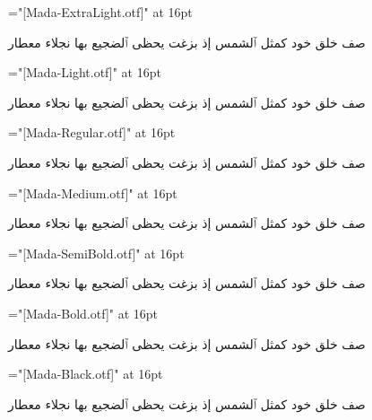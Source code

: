 \nopagenumbers
{}
\def\sample#1{%
  \font\test="[Mada-#1.otf]" at 16pt%
  \centerline{%
    \beginR%
    \test%
    صف خلق خود كمثل ٱلشمس إذ بزغت يحظى ٱلضجيع بها نجلاء معطار%
    \endR%
  }%
}

\sample{ExtraLight}
\sample{Light}
\sample{Regular}
\sample{Medium}
\sample{SemiBold}
\sample{Bold}
\sample{Black}
\bye
